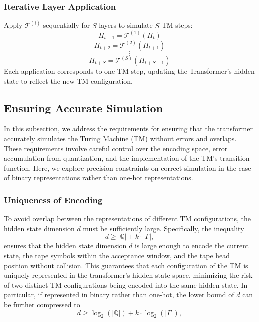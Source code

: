 \subsubsection{Iterative Layer Application}
Apply \( \mathcal{T}^{(i)} \) sequentially for \( S \) layers to simulate \( S \) TM steps:
\[
H_{t+1} = \mathcal{T}^{(1)}(H_t)
\]
\[
H_{t+2} = \mathcal{T}^{(2)}(H_{t+1})
\]
\[
\vdots
\]
\[
H_{t+S} = \mathcal{T}^{(S)}(H_{t+S-1})
\]
Each application corresponds to one TM step, updating the Transformer's hidden state to reflect the new TM configuration.


\subsection{Ensuring Accurate Simulation}\label{appendix:A5}

In this subsection, we address the requirements for ensuring that the transformer accurately simulates the Turing Machine (TM) without errors and overlaps. These requirements involve careful control over the encoding space, error accumulation from quantization, and the implementation of the TM’s transition function. Here, we explore precision constraints on correct simulation in the case of binary representations rather than one-hot representations.

\subsubsection{Uniqueness of Encoding}\label{Appendix d}

To avoid overlap between the representations of different TM configurations, the hidden state dimension \( d \) must be sufficiently large. Specifically, the inequality
{\color{black} \[
d \geq |\mathbb{Q}| + k \cdot |\Gamma|,
\]}
ensures that the hidden state dimension \( d \) is large enough to encode the current state, the tape symbols within the acceptance window, and the tape head position without collision. This guarantees that each configuration of the TM is uniquely represented in the transformer's hidden state space, minimizing the risk of two distinct TM configurations being encoded into the same hidden state.
{\color{black} In particular, if represented in binary rather than one-hot, the lower bound of \(d\) can be further compressed to \[
d \geq \log_2(|\mathbb{Q}|) + k \cdot \log_2(|\Gamma|),
\]}

